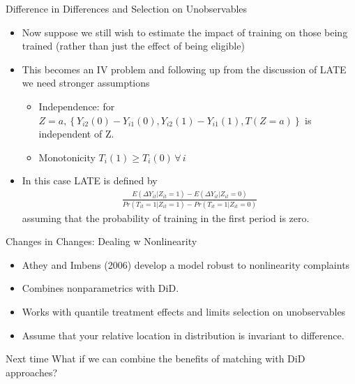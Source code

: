 \begin{frame}{Difference in Differences and Selection on Unobservables}
\begin{itemize}
\item Now suppose we still wish to estimate the impact of training on those being trained (rather than just the effect of being eligible)
\item This becomes an IV problem and following up from the discussion of LATE we need stronger assumptions
\begin{itemize}
\item  Independence: for $Z = a, \left\{Y_{i2}(0) - Y_{i1}(0), Y_{i2}(1) - Y_{i1}(1), T(Z=a)\right\}$ is independent of Z.
\item Monotonicity $T_i(1) \ge T_i(0) \, \forall \, i$
\end{itemize}
\item In this case LATE is defined by
\begin{align*}
\frac{E(\Delta Y_{it} | Z_{it} = 1) - E(\Delta Y_{it} | Z_{it} = 0)}{ Pr(T_{it}= 1| Z_{it}=1) - Pr(T_{it} = 1 | Z_{it} =0)}
\end{align*}
assuming that the probability of training in the first period is zero.
\end{itemize}              
\end{frame}

\begin{frame}{Changes in Changes: Dealing w Nonlinearity}
\begin{itemize}
\item Athey and Imbens (2006) develop a model robust to nonlinearity complaints
\item Combines nonparametrics with DiD.
\item Works with \alert{quantile treatment effects} and limits selection on unobservables
\item Assume that your relative location in distribution is invariant to difference.
\end{itemize}
\end{frame}

\begin{frame}{Next time}
What if we can combine the benefits of matching with DiD approaches?
\end{frame}


